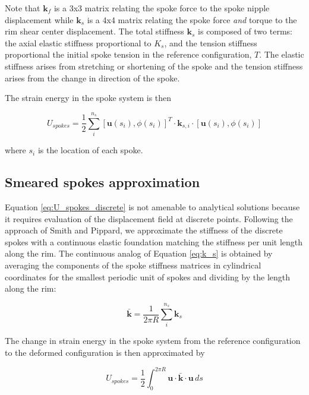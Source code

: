 \documentclass[../thesis.tex]{subfiles}
\begin{document}
Note that $\mathbf{k}_f$ is a 3x3 matrix relating the spoke force to the spoke nipple displacement while $\mathbf{k}_s$ is a 4x4 matrix relating the spoke force \emph{and} torque to the rim shear center displacement. The total stiffness $\mathbf{k}_s$ is composed of two terms: the axial elastic stiffness proportional to $K_s$, and the tension stiffness proportional the initial spoke tension in the reference configuration, $T$. The elastic stiffness arises from stretching or shortening of the spoke and the tension stiffness arises from the change in direction of the spoke.

The strain energy in the spoke system is then

\begin{equation}
\label{eq:U_spokes_discrete}
U_{spokes} = \frac{1}{2} \sum_i^{n_s} [\mathbf{u}(s_i), \phi(s_i)]^T \cdot \mathbf{k}_{s,i}\cdot [\mathbf{u}(s_i), \phi(s_i)]
\end{equation}

where $s_i$ is the location of each spoke.

\subsection{Smeared spokes approximation}
Equation \ref{eq:U_spokes_discrete} is not amenable to analytical solutions because it requires evaluation of the displacement field at discrete points. Following the approach of Smith\cite{Smith} and Pippard\cite{Pippard}, we approximate the stiffness of the discrete spokes with a continuous elastic foundation matching the stiffness per unit length along the rim. The continuous analog of Equation \eqref{eq:k_s} is obtained by averaging the components of the spoke stiffness matrices in cylindrical coordinates for the smallest periodic unit of spokes and dividing by the length along the rim:

\begin{equation}
\label{eq:k_bar}
\mathbf{\bar{k}} = \frac{1}{2\pi R} \sum_i^{n_s} \mathbf{k}_s
\end{equation}

The change in strain energy in the spoke system from the reference configuration to the deformed configuration is then approximated by

\begin{equation}
\label{eq:U_spokes}
U_{spokes} = \frac{1}{2}\int_0^{2\pi R} \mathbf{u} \cdot \mathbf{\bar{k}} \cdot \mathbf{u} \, ds
\end{equation}
\end{document}
